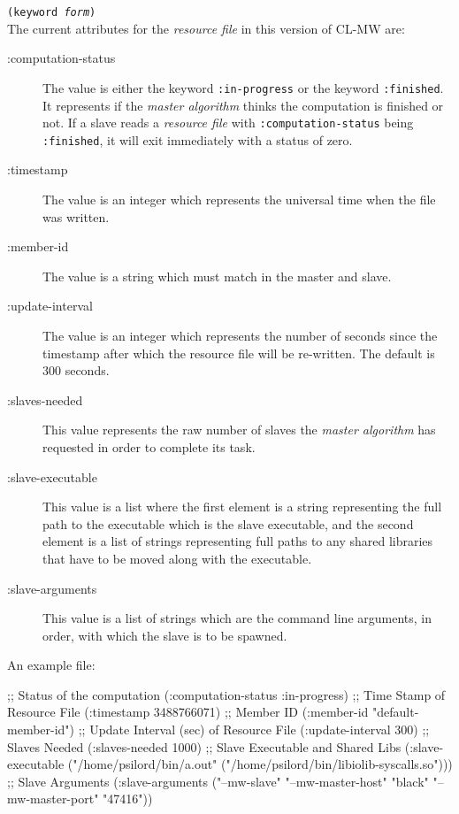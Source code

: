 \documentclass[titlepage,12pt]{book}
\newcommand{\xsmall}{\latexhtml{\small}{}}
\newcommand{\xnormalsize}{\latexhtml{\normalsize}{}}
\newcommand{\clmw}{\xsmall\textsc{CL-MW}\xnormalsize\xspace}
\newcommand{\ma}{\textit{master algorithm}\xspace}
\newcommand{\rfile}{\textit{resource file}\xspace}
\begin{document}
\noindent\texttt{(keyword \textit{form})}\\

The current attributes for the \rfile in this version of \clmw are:

\begin{description}
\item[:computation-status] 
	The value is either the keyword \texttt{:in-progress} or the
	keyword \texttt{:finished}. It represents if the \ma thinks
	the computation is finished or not. If a slave reads a \rfile
	with \texttt{:computation-status} being \texttt{:finished},
	it will exit immediately with a status of zero.

\item[:timestamp] 
	The value is an integer which represents the universal time when the file
	was written.

\item[:member-id] 
	The value is a string which must match in the master and slave.

\item[:update-interval]
	The value is an integer which represents the number of seconds since the
	timestamp after which the resource file will be re-written. The default 
	is 300 seconds.

\item[:slaves-needed]
	This value represents the raw number of slaves the \ma has requested in
	order to complete its task.

\item[:slave-executable]
	This value is a list where the first element is a string
	representing the full path to the executable which is the
	slave executable, and the second element is a list of strings
	representing full paths to any shared libraries that have to
	be moved along with the executable.

\item[:slave-arguments]
	This value is a list of strings which are the command line arguments,
	in order, with which the slave is to be spawned.
\end{description}

An example file:

\begin{lisp}[caption=Contents of a sample \rfile]
;; Status of the computation
(:computation-status :in-progress)
;; Time Stamp of Resource File
(:timestamp 3488766071)
;; Member ID
(:member-id "default-member-id")
;; Update Interval (sec) of Resource File
(:update-interval 300)
;; Slaves Needed
(:slaves-needed 1000)
;; Slave Executable and Shared Libs
(:slave-executable 
   ("/home/psilord/bin/a.out" ("/home/psilord/bin/libiolib-syscalls.so")))
;; Slave Arguments
(:slave-arguments ("--mw-slave" "--mw-master-host" "black" 
                   "--mw-master-port" "47416"))
\end{lisp}
\end{document}
